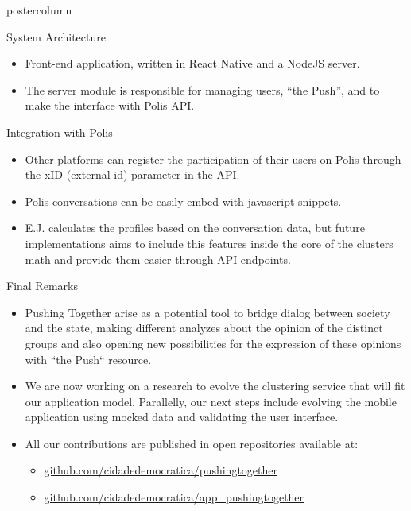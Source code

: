 \documentclass[final,hyperref={pdfpagelabels=false}]{beamer}
\begin{document}
\begin{frame}
\begin{columns}
\begin{column}{.49\textwidth}
\begin{beamercolorbox}[center,wd=\textwidth]{postercolumn}
\begin{minipage}[T]{.95\textwidth}
{\begin{block}{System Architecture}
	\begin{itemize}
    \item Front-end application, written in React Native
    and a NodeJS server.

    \item The server module is responsible for managing users, ``the Push'', and
    to make the interface with Polis API.
  \end{itemize}

\end{block}

\begin{block}{Integration with Polis}
  \begin{itemize}
    \item Other platforms can register the participation of their users on Polis
    through the xID (external id) parameter in the API.

    \item Polis conversations can be easily embed with javascript snippets.

    \item E.J. calculates the profiles based on the conversation data, but future
    implementations aims to include this features inside the core of the clusters
    math and provide them easier through API endpoints.
  \end{itemize}
\end{block}

\begin{block}{Final Remarks}
  \begin{itemize}
    \item Pushing Together arise as a potential tool to bridge dialog between society and
    the state, making different analyzes about the opinion of the distinct groups
    and also opening new possibilities for the expression of these opinions with ``the
    Push`` resource.

    \item We are now working on a research to evolve the clustering service that
    will fit our application model. Parallelly, our next steps include evolving the
    mobile application using mocked data and validating the user interface.

    \item All our contributions are published in open repositories available at:
      \begin{itemize}
        \color{magenta}
        \item \url{github.com/cidadedemocratica/pushingtogether}
        \item \url{github.com/cidadedemocratica/app_pushingtogether}
      \end{itemize}
  \end{itemize}
\end{block}
      }
        \end{minipage}
      \end{beamercolorbox}
    \end{column}
  \end{columns}
\end{frame}
\end{document}
